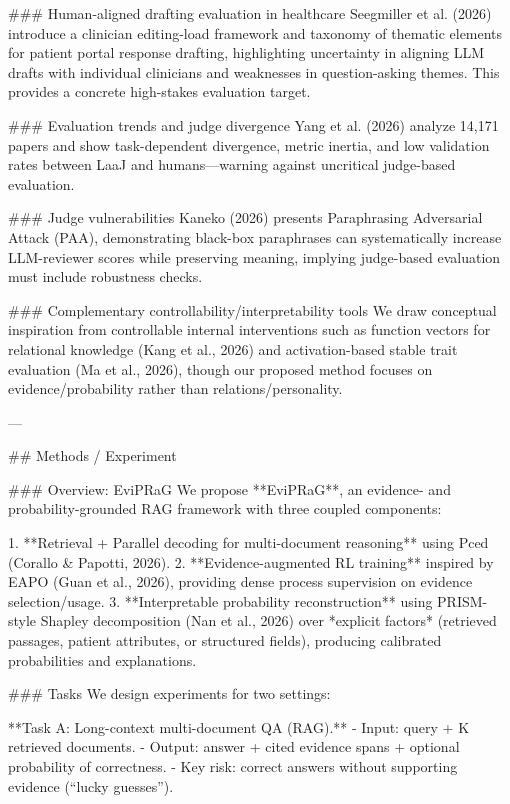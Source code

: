 ### Human-aligned drafting evaluation in healthcare  
Seegmiller et al. (2026) introduce a clinician editing-load framework and taxonomy of thematic elements for patient portal response drafting, highlighting uncertainty in aligning LLM drafts with individual clinicians and weaknesses in question-asking themes. This provides a concrete high-stakes evaluation target.

### Evaluation trends and judge divergence  
Yang et al. (2026) analyze 14,171 papers and show task-dependent divergence, metric inertia, and low validation rates between LaaJ and humans—warning against uncritical judge-based evaluation.

### Judge vulnerabilities  
Kaneko (2026) presents Paraphrasing Adversarial Attack (PAA), demonstrating black-box paraphrases can systematically increase LLM-reviewer scores while preserving meaning, implying judge-based evaluation must include robustness checks.

### Complementary controllability/interpretability tools  
We draw conceptual inspiration from controllable internal interventions such as function vectors for relational knowledge (Kang et al., 2026) and activation-based stable trait evaluation (Ma et al., 2026), though our proposed method focuses on evidence/probability rather than relations/personality.

---

## Methods / Experiment  

### Overview: EviPRaG  
We propose **EviPRaG**, an evidence- and probability-grounded RAG framework with three coupled components:

1. **Retrieval + Parallel decoding for multi-document reasoning** using Pced (Corallo & Papotti, 2026).  
2. **Evidence-augmented RL training** inspired by EAPO (Guan et al., 2026), providing dense process supervision on evidence selection/usage.  
3. **Interpretable probability reconstruction** using PRISM-style Shapley decomposition (Nan et al., 2026) over *explicit factors* (retrieved passages, patient attributes, or structured fields), producing calibrated probabilities and explanations.

### Tasks  
We design experiments for two settings:

**Task A: Long-context multi-document QA (RAG).**  
- Input: query + K retrieved documents.  
- Output: answer + cited evidence spans + optional probability of correctness.  
- Key risk: correct answers without supporting evidence (“lucky guesses”).

